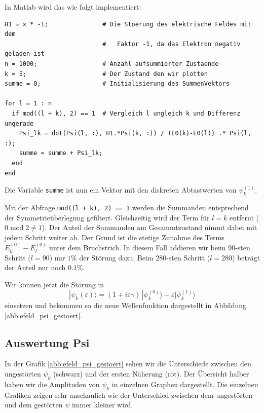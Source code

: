 \begin{refsection}
In Matlab wird das wie folgt implementiert:
\begin{lstlisting}[style=Matlab]
H1 = x * -1;               # Die Stoerung des elektrische Feldes mit dem
                           #   Faktor -1, da das Elektron negativ geladen ist
n = 1000;                  # Anzahl aufsummierter Zustaende
k = 5;                     # Der Zustand den wir plotten
summe = 0;                 # Initialisierung des SummenVektors

for l = 1 : n
  if mod((l + k), 2) == 1  # Vergleich l ungleich k und Differenz ungerade
    Psi_lk = dot(Psi(l, :), H1.*Psi(k, :)) / (E0(k)-E0(l)) .* Psi(l, :);
    summe = summe + Psi_lk;
  end
end
\end{lstlisting}
Die Variable \verb|summe| ist nun ein Vektor mit den diskreten Abtastwerten von $\psi_k^{(1)}$.

Mit der Abfrage \verb|mod((l + k), 2) == 1| werden die Summanden 
entsprechend der Symmetrie\"uberlegung gefiltert.
Gleichzeitig wird der Term f\"ur $l=k$ entfernt ($0 \operatorname{mod} 2 \ne 1$).
Der Anteil der Summanden am Gesammtzustand nimmt dabei mit jedem Schritt weiter ab.
Der Grund ist die stetige Zunahme des Terms $E^{(0)}_k-E^{(0)}_l$ unter dem Bruchstrich.
In diesem Fall addieren wir beim 90-sten Schritt ($l=90$) nur $1\%$ der St\"orung dazu.
Beim 280-sten Schritt ($l=280$) betr\"agt der Anteil nur noch $0.1\%$.

Wir k\"onnen jetzt die St\"orung in 
\begin{equation}
|\psi_k(\varepsilon)\rangle
=
(1+i\varepsilon \gamma)
\,|\psi_k^{(0)}\rangle
+
\varepsilon|\psi_k^{(1)}\rangle
\end{equation}
einsetzen und bekommen so die neue Wellenfunktion dargestellt in Abbildung \ref{abb:efeld_psi_gestoert}.




\subsection{Auswertung Psi}

In der Grafik \ref{abb:efeld_psi_gestoert} sehen wir die Unterschiede zwischen den ungest\"orten 
$\psi_k$ (schwarz) und der ersten N\"aherung (rot).
Der \"Ubersicht halber haben wir die Amplituden von $\psi_k$ in einzelnen Graphen dargestellt.
Die einzelnen Grafiken zeigen sehr anschaulich wie der Unterschied zwischen dem ungest\"orten und dem gest\"orten $\psi$
immer kleiner wird.


\end{refsection}
